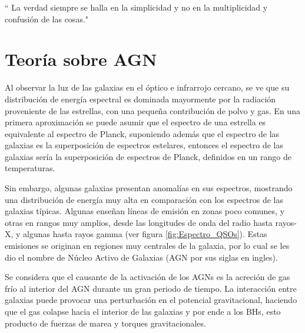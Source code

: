 \begin{savequote}[50mm]
`` La verdad siempre se halla en la simplicidad y no en la multiplicidad y confusión de las cosas."
\end{savequote}




\chapter{Teoría sobre AGN}
\label{cha:Theoretical Framework}


Al observar la luz de las galaxias en el óptico e infrarrojo cercano, se ve que su distribución de energía espectral es dominada mayormente por la radiación proveniente de las estrellas, con una pequeña contribución de polvo y gas. En una primera aproximación se puede asumir que el espectro de una estrella es equivalente al espectro de Planck, suponiendo además que el espectro de las galaxias es la superposición de espectros estelares, entonces el espectro de las galaxias sería la superposición de espectros de Planck, definidos en un rango de temperaturas. 


Sin embargo, algunas galaxias presentan anomalías en sus espectros,  mostrando una distribución de energía muy alta en comparación con los espectros  de las galaxias típicas. Algunas enseñan líneas de emisión en zonas poco comunes, y otras en rangos muy amplios, desde las longitudes de onda del radio hasta rayos-X, y algunas hasta rayos gamma (ver figura \ref{fig:Espectro_QSOs}). Estas emisiones se originan en regiones muy centrales de la galaxia, por lo cual se les dio el nombre de Núcleo Activo de Galaxias (AGN por sus siglas en ingles).

Se considera que el causante de la activación de los AGNs es la acreción de gas frío al interior del AGN durante un gran periodo de tiempo. La interacción entre galaxias puede provocar una perturbación en el potencial gravitacional, haciendo que el gas colapse hacia el interior de las galaxias y por ende a los BHs, esto producto de fuerzas de marea y torques gravitacionales.

